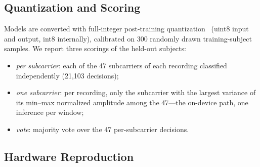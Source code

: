 \documentclass[journal]{IEEEtran}
\begin{document}
\subsection{Quantization and Scoring}
Models are converted with full-integer post-training quantization~\cite{jacob2018quant}
(uint8 input and output, int8 internally), calibrated on 300 randomly drawn
training-subject samples. We report three scorings of the held-out subjects:
\begin{itemize}
\item \emph{per subcarrier}: each of the 47 subcarriers of each recording classified
      independently (21{,}103 decisions);
\item \emph{one subcarrier}: per recording, only the subcarrier with the largest
      variance of its min--max normalized amplitude among the 47---the on-device
      path, one inference per window;
\item \emph{vote}: majority vote over the 47 per-subcarrier decisions.
\end{itemize}

\subsection{Hardware Reproduction}
\end{document}
